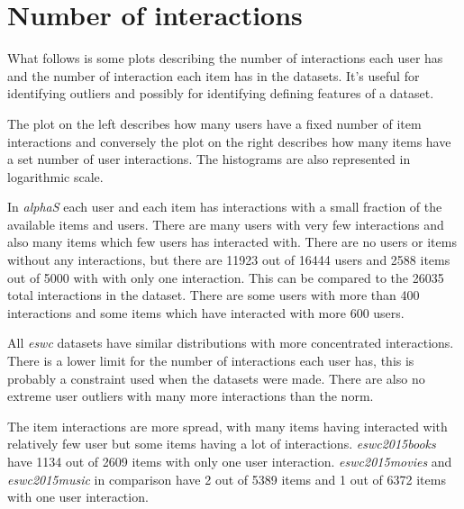 
\section{Number of interactions}\label{sec:result:interactions}

What follows is some plots describing the number of interactions each user has and the number of interaction each item has in the datasets. It's useful for identifying outliers and possibly for identifying defining features of a dataset.

The plot on the left describes how many users have a fixed number of item interactions and conversely the plot on the right describes how many items have a set number of user interactions. The histograms are also represented in logarithmic scale.

\FloatBarrier


In \textit{alphaS} each user and each item has interactions with a small fraction of the available items and users. There are many users with very few interactions and also many items which few users has interacted with. There are no users or items without any interactions, but there are 11923 out of 16444 users and 2588 items out of 5000 with with only one interaction. This can be compared to the 26035 total interactions in the dataset. There are some users with more than 400 interactions and some items which have interacted with more 600 users.

\newpage




\FloatBarrier

All \textit{eswc} datasets have similar distributions with more concentrated interactions. There is a lower limit for the number of interactions each user has, this is probably a constraint used when the datasets were made.
There are also no extreme user outliers with many more interactions than the norm.

The item interactions are more spread, with many items having interacted with relatively few user but some items having a lot of interactions. \textit{eswc2015books} have 1134 out of 2609 items with only one user interaction. \textit{eswc2015movies} and \textit{eswc2015music} in comparison have 2 out of 5389 items and 1 out of 6372 items with one user interaction.

